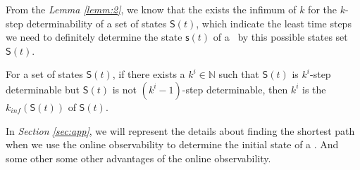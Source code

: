 From the {\em Lemma \ref{lemm:2}}, we know that the exists the infimum of $k$ for the $k$-step determinability of a set of states $\mathsf{S}(t)$, which indicate the least time steps we need to definitely determine the state $\mathsf{s}(t)$ of a \BCN\ by this possible states set $\mathsf{S}(t)$.
\begin{definition} 
For a set of states $\mathsf{S}(t)$, if there exists a $k^i\in \mathbb{N}$ such that $\mathsf{S}(t)$ is $k^i$-step determinable but $\mathsf{S}(t)$ is not $(k^{i}-1)$-step determinable, then $k^{i}$ is the $k_{inf}(\mathsf{S}(t))$ of $\mathsf{S}(t)$.
\end{definition}

In {\em Section \ref{sec:app}}, we will represent the details about finding the shortest path when we use the online observability to determine the initial state of a \BCN. And some other some other advantages of the online observability.



